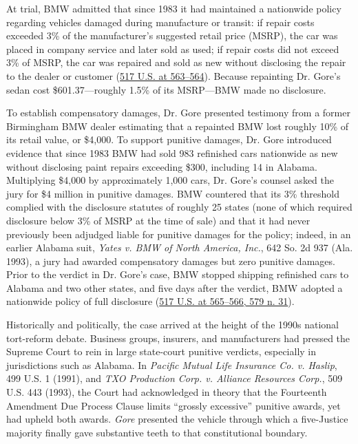 \documentclass[12pt]{article}
\begin{document}
At trial, BMW admitted that since 1983 it had maintained a nationwide policy regarding vehicles damaged during manufacture or transit: if repair costs exceeded 3\% of the manufacturer's suggested retail price (MSRP), the car was placed in company service and later sold as used; if repair costs did not exceed 3\% of MSRP, the car was repaired and sold as new without disclosing the repair to the dealer or customer (\href{https://supreme.justia.com/cases/federal/us/517/559/}{517 U.S. at 563--564}). Because repainting Dr. Gore's sedan cost \$601.37---roughly 1.5\% of its MSRP---BMW made no disclosure.

To establish compensatory damages, Dr. Gore presented testimony from a former Birmingham BMW dealer estimating that a repainted BMW lost roughly 10\% of its retail value, or \$4,000. To support punitive damages, Dr. Gore introduced evidence that since 1983 BMW had sold 983 refinished cars nationwide as new without disclosing paint repairs exceeding \$300, including 14 in Alabama. Multiplying \$4,000 by approximately 1,000 cars, Dr. Gore's counsel asked the jury for \$4 million in punitive damages. BMW countered that its 3\% threshold complied with the disclosure statutes of roughly 25 states (none of which required disclosure below 3\% of MSRP at the time of sale) and that it had never previously been adjudged liable for punitive damages for the policy; indeed, in an earlier Alabama suit, \textit{Yates v. BMW of North America, Inc.}, 642 So. 2d 937 (Ala. 1993), a jury had awarded compensatory damages but zero punitive damages. Prior to the verdict in Dr. Gore's case, BMW stopped shipping refinished cars to Alabama and two other states, and five days after the verdict, BMW adopted a nationwide policy of full disclosure (\href{https://supreme.justia.com/cases/federal/us/517/559/}{517 U.S. at 565--566, 579 n. 31}).

Historically and politically, the case arrived at the height of the 1990s national tort-reform debate. Business groups, insurers, and manufacturers had pressed the Supreme Court to rein in large state-court punitive verdicts, especially in jurisdictions such as Alabama. In \textit{Pacific Mutual Life Insurance Co. v. Haslip}, 499 U.S. 1 (1991), and \textit{TXO Production Corp. v. Alliance Resources Corp.}, 509 U.S. 443 (1993), the Court had acknowledged in theory that the Fourteenth Amendment Due Process Clause limits ``grossly excessive'' punitive awards, yet had upheld both awards. \textit{Gore} presented the vehicle through which a five-Justice majority finally gave substantive teeth to that constitutional boundary.
\end{document}
